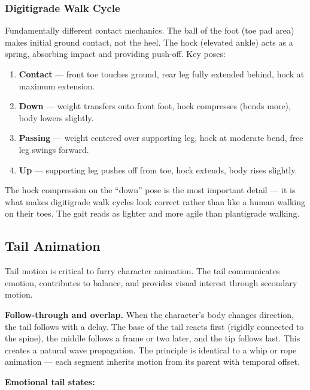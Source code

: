 \subsubsection{Digitigrade Walk Cycle}

Fundamentally different contact mechanics. The ball of the foot (toe pad area) makes initial ground contact, not the heel. The hock (elevated ankle) acts as a spring, absorbing impact and providing push-off. Key poses:

\begin{enumerate}[leftmargin=2em]
  \item \textbf{Contact} --- front toe touches ground, rear leg fully extended behind, hock at maximum extension.
  \item \textbf{Down} --- weight transfers onto front foot, hock compresses (bends more), body lowers slightly.
  \item \textbf{Passing} --- weight centered over supporting leg, hock at moderate bend, free leg swings forward.
  \item \textbf{Up} --- supporting leg pushes off from toe, hock extends, body rises slightly.
\end{enumerate}

\begin{furrybox}
The hock compression on the ``down'' pose is the most important detail --- it is what makes digitigrade walk cycles look correct rather than like a human walking on their toes. The gait reads as lighter and more agile than plantigrade walking.
\end{furrybox}


\subsection{Tail Animation}

Tail motion is critical to furry character animation. The tail communicates emotion, contributes to balance, and provides visual interest through secondary motion.

\textbf{Follow-through and overlap.} When the character's body changes direction, the tail follows with a delay. The base of the tail reacts first (rigidly connected to the spine), the middle follows a frame or two later, and the tip follows last. This creates a natural wave propagation. The principle is identical to a whip or rope animation --- each segment inherits motion from its parent with temporal offset.

\textbf{Emotional tail states:}

